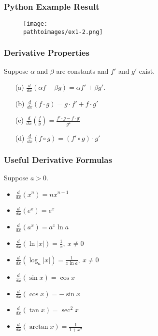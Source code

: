 \documentclass{beamer}
\newcommand{\pathtoimages}{/Users/charlesrambo/Desktop/Bootcamp24/Images}
\begin{document}
\begin{frame}
\frametitle{Python Example Result}

\begin{figure}
\centering
\texttt{[image: \\pathtoimages/ex1-2.png]}
\end{figure}

\end{frame}

\begin{frame}
\frametitle{Derivative Properties}
\begin{Theorem}
Suppose $\alpha$ and $\beta$ are constants and $f'$ and $g'$ exist. 
\begin{enumerate}
\item[(a)] $\displaystyle\frac{d}{dx}\left(\alpha f + \beta g\right) = \alpha f' + \beta g'$.
\item[(b)] $\displaystyle\frac{d}{dx}\left(f\cdot g\right) = g\cdot f' + f\cdot g'$
\item[(c)] $\displaystyle\frac{d}{dx}\left(\frac{f}{g}\right) = \frac{f'\cdot g - f\cdot g'}{g^2}$
\item[(d)] $\displaystyle\frac{d}{dx}\left(f\circ g\right) = \left(f' \circ g\right)\cdot g'$
\end{enumerate}
\end{Theorem}
\end{frame}

\begin{frame}
\frametitle{Useful Derivative Formulas}
Suppose $a > 0$.
\begin{multicols}{2}
\begin{itemize}
\item $\frac{d}{dx}(x^n) = n x^{n-1}$				
\item $\frac{d}{dx}(e^x)  = e^x$
\item $\frac{d}{dx}(a^x)  = a^x \ln a$
\item $\frac{d}{dx}\left(\ln|x|\right)  = \frac{1}{x},\ x\neq 0$
\item $\frac{d}{dx}\left(\log_a|x|\right) = \frac{1}{x\ln a},\ x\neq 0$
\item $\frac{d}{dx}\left(\sin x\right) = \cos x$
\item $\frac{d}{dx}\left(\cos x\right) = -\sin x$
\item $\frac{d}{dx}\left(\tan x\right) = \sec^2 x$
\item $\frac{d}{dx}\left(\arctan x\right) = \frac{1}{1 + x^2}$
\end{itemize}
\end{multicols}
\end{frame}
\end{document}
